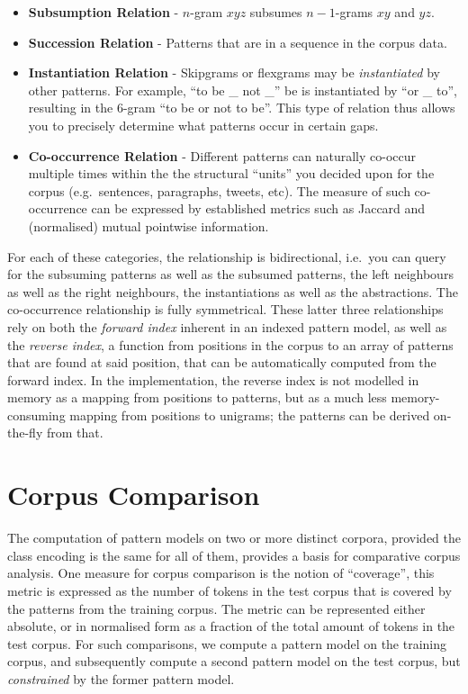 \begin{itemize}
 \item \textbf{Subsumption Relation} - $n$-gram $x y z$ subsumes $n-1$-grams $x y$ and $y z$. 
 \item \textbf{Succession Relation} - Patterns that are in a sequence in the corpus data. 
 \item \textbf{Instantiation Relation} - Skipgrams or flexgrams may be
     \emph{instantiated} by other patterns. For example, ``to be \_ not \_'' be
     is instantiated by ``or \_ to'', resulting in the 6-gram ``to be or not to be''. This type of relation thus allows you to precisely determine what patterns occur in certain gaps.
 \item \textbf{Co-occurrence Relation} - Different patterns can naturally co-occur multiple times
     within the the structural ``units'' you decided upon for the corpus (e.g.\ 
     sentences, paragraphs, tweets, etc). The measure of such co-occurrence 
     can be expressed by established metrics such as Jaccard and (normalised) mutual
     pointwise information.
\end{itemize}

For each of these categories, the relationship is bidirectional, i.e.\ you can
query for the subsuming patterns as well as the subsumed patterns, the left
neighbours as well as the right neighbours, the instantiations as well as the
abstractions. The co-occurrence relationship is fully symmetrical. These latter
three relationships rely on both the \emph{forward index} inherent in an
indexed pattern model, as well as the \emph{reverse index}, a function from
positions in the corpus to an array of patterns that are found at said
position, that can be automatically computed from the forward index. In the
implementation, the reverse index is not modelled in memory as a mapping from
positions to patterns, but as a much less memory-consuming mapping from positions
to unigrams; the patterns can be derived on-the-fly from that.

\section{Corpus Comparison}

The computation of pattern models on two or more distinct corpora, provided the
class encoding is the same for all of them, provides a basis for comparative
corpus analysis. One measure for corpus comparison is the notion of
``coverage'', this metric is expressed as the number of tokens in the test
corpus that is covered by the patterns from the training corpus. The metric can
be represented either absolute, or in normalised form as a fraction of the
total amount of tokens in the test corpus. For such comparisons, we compute a
pattern model on the training corpus, and subsequently compute a second pattern
model on the test corpus, but \emph{constrained} by the former pattern model. 



